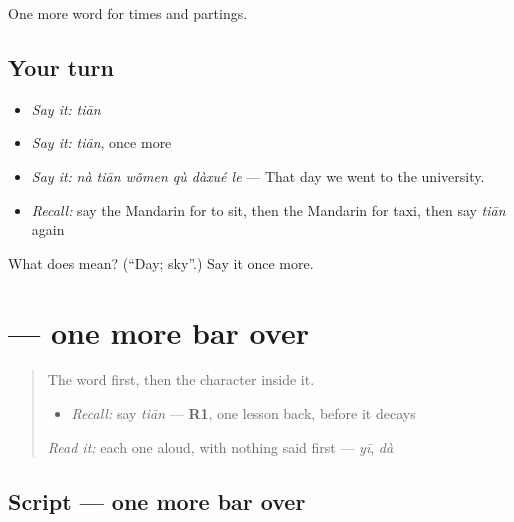 \begin{grammarlens}[title={What you've built}]
One more word for times and partings.
\end{grammarlens}

\subsection*{Your turn}
\begin{itemize}
\raggedright
  \item \emph{Say it:} \emph{tiān}
  \item \emph{Say it:} \emph{tiān}, once more
  \item \emph{Say it:} \emph{nà tiān wǒmen qù dàxué le} — That day we went to the university.
  \item \emph{Recall:} say the Mandarin for to sit, then the Mandarin for taxi, then say \emph{tiān} again
\end{itemize}

\begin{tcolorbox}[breakable,colback=teal!4,colframe=teal!35!black,title={Before you move on}]
What does  mean? (\textquotedblleft{}Day; sky\textquotedblright{}.) Say it once more.
\end{tcolorbox}
\section[\texorpdfstring{\zh{天} (tiān)}{天 (tiān)}]{ — one more bar over }

\label{lesson:ZH-W45-tian}



\begin{quote}
The word first, then the character inside it.

\begin{itemize}
\raggedright
  \item \emph{Recall:} say \emph{tiān} — \textbf{R1}, one lesson back, before it decays
\end{itemize}

\begin{quote}
 
\end{quote}

\emph{Read it:} each one aloud, with nothing said first — \emph{yī}, \emph{dà}
\end{quote}

\subsection*{Script — one more bar over }

